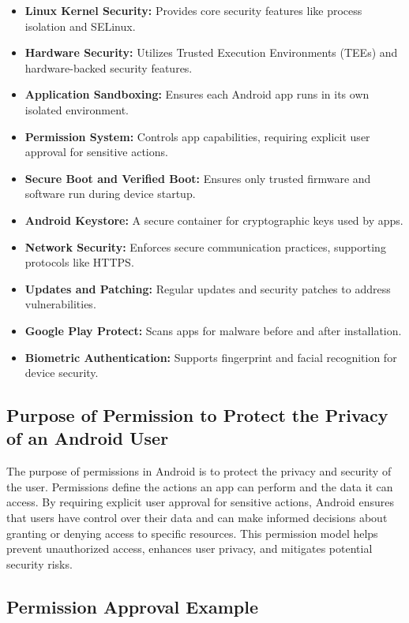 \documentclass[11pt]{article}
\begin{document}
\begin{itemize}
    \item \textbf{Linux Kernel Security:} Provides core security features like process isolation and SELinux.
    \item \textbf{Hardware Security:} Utilizes Trusted Execution Environments (TEEs) and hardware-backed security features.
    \item \textbf{Application Sandboxing:} Ensures each Android app runs in its own isolated environment.
    \item \textbf{Permission System:} Controls app capabilities, requiring explicit user approval for sensitive actions.
    \item \textbf{Secure Boot and Verified Boot:} Ensures only trusted firmware and software run during device startup.
    \item \textbf{Android Keystore:} A secure container for cryptographic keys used by apps.
    \item \textbf{Network Security:} Enforces secure communication practices, supporting protocols like HTTPS.
    \item \textbf{Updates and Patching:} Regular updates and security patches to address vulnerabilities.
    \item \textbf{Google Play Protect:} Scans apps for malware before and after installation.
    \item \textbf{Biometric Authentication:} Supports fingerprint and facial recognition for device security.
\end{itemize}

\subsection{Purpose of Permission to Protect the Privacy of an Android User}

The purpose of permissions in Android is to protect the privacy and security of the user. Permissions define the actions an app can perform and the data it can access. By requiring explicit user approval for sensitive actions, Android ensures that users have control over their data and can make informed decisions about granting or denying access to specific resources. This permission model helps prevent unauthorized access, enhances user privacy, and mitigates potential security risks.

\subsection{Permission Approval Example}
\end{document}

